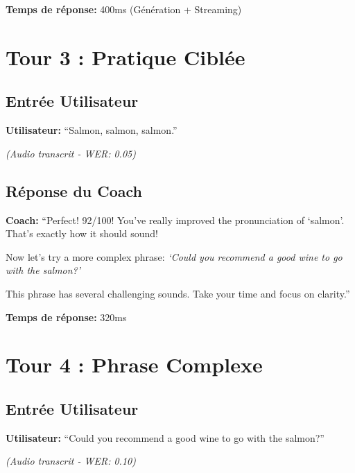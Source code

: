 \documentclass[12pt,a4paper,oneside]{report}
\begin{document}
\vspace{0.5cm}

\textbf{Temps de réponse:} 400ms (Génération + Streaming)

\section{Tour 3 : Pratique Ciblée}

\subsection{Entrée Utilisateur}

\begin{tcolorbox}[colback=userblue!10, colframe=userblue, title=Utilisateur - Tentative 3]
\textbf{Utilisateur:} ``Salmon, salmon, salmon.''

\textit{(Audio transcrit - WER: 0.05)}
\end{tcolorbox}

\subsection{Réponse du Coach}

\begin{tcolorbox}[colback=coachgreen!10, colframe=coachgreen, title=Coach IA - Encouragement]
\textbf{Coach:} ``Perfect! 92/100! You've really improved the pronunciation of `salmon'. 
That's exactly how it should sound!

Now let's try a more complex phrase: \textit{`Could you recommend a good wine to go with the salmon?'}

This phrase has several challenging sounds. Take your time and focus on clarity.''
\end{tcolorbox}

\vspace{0.5cm}

\textbf{Temps de réponse:} 320ms

\section{Tour 4 : Phrase Complexe}

\subsection{Entrée Utilisateur}

\begin{tcolorbox}[colback=userblue!10, colframe=userblue, title=Utilisateur - Tentative 4]
\textbf{Utilisateur:} ``Could you recommend a good wine to go with the salmon?''

\textit{(Audio transcrit - WER: 0.10)}
\end{tcolorbox}
\end{document}
